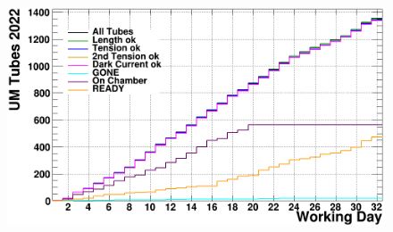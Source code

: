 \documentclass{beamer}
\begin{document}
	\begin{frame}
		\begin{figure}
			\includegraphics[width=\linewidth]{UMdaily2022.png}
		\end{figure}
	\end{frame}
\end{document}
